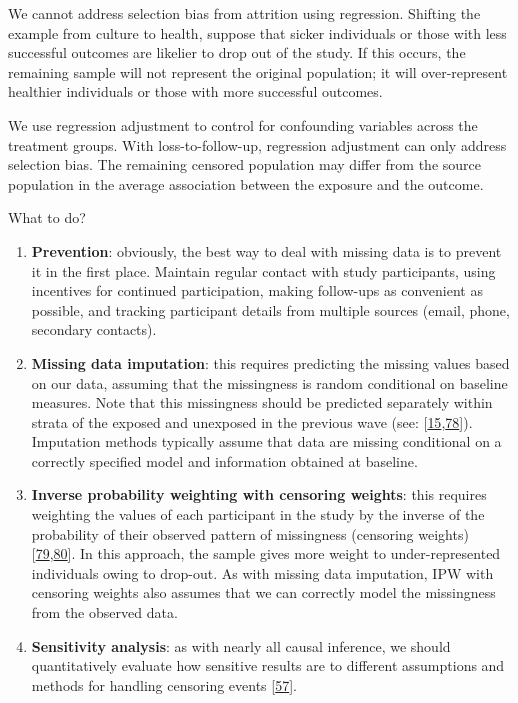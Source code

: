 \documentclass[
  singlecolumn]{article}
\begin{document}
We cannot address selection bias from attrition using regression.
Shifting the example from culture to health, suppose that sicker
individuals or those with less successful outcomes are likelier to drop
out of the study. If this occurs, the remaining sample will not
represent the original population; it will over-represent healthier
individuals or those with more successful outcomes.

We use regression adjustment to control for confounding variables across
the treatment groups. With loss-to-follow-up, regression adjustment can
only address selection bias. The remaining censored population may
differ from the source population in the average association between the
exposure and the outcome.

What to do?

\begin{enumerate}
\def\labelenumi{\arabic{enumi}.}
\item
  \textbf{Prevention}: obviously, the best way to deal with missing data
  is to prevent it in the first place. Maintain regular contact with
  study participants, using incentives for continued participation,
  making follow-ups as convenient as possible, and tracking participant
  details from multiple sources (email, phone, secondary contacts).
\item
  \textbf{Missing data imputation}: this requires predicting the missing
  values based on our data, assuming that the missingness is random
  conditional on baseline measures. Note that this missingness should be
  predicted separately within strata of the exposed and unexposed in the
  previous wave (see:
  {[}\protect\hyperlink{ref-westreich2015}{15},\protect\hyperlink{ref-zhang2023}{78}{]}).
  Imputation methods typically assume that data are missing conditional
  on a correctly specified model and information obtained at baseline.
\item
  \textbf{Inverse probability weighting with censoring weights}: this
  requires weighting the values of each participant in the study by the
  inverse of the probability of their observed pattern of missingness
  (censoring
  weights){[}\protect\hyperlink{ref-leyrat2019}{79},\protect\hyperlink{ref-cole2008}{80}{]}.
  In this approach, the sample gives more weight to under-represented
  individuals owing to drop-out. As with missing data imputation, IPW
  with censoring weights also assumes that we can correctly model the
  missingness from the observed data.
\item
  \textbf{Sensitivity analysis}: as with nearly all causal inference, we
  should quantitatively evaluate how sensitive results are to different
  assumptions and methods for handling censoring events
  {[}\protect\hyperlink{ref-shi2021}{57}{]}.
\end{enumerate}
\end{document}

